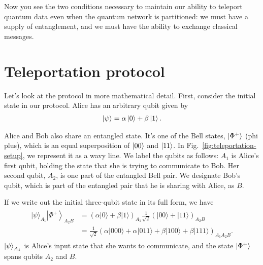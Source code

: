 Now you see the two conditions necessary to maintain our ability to teleport quantum data even when the quantum network is partitioned: we must have a supply of entanglement, and we must have the ability to exchange classical messages.

\section{Teleportation protocol}
\label{sec:8-2_teleportation_protocol}


Let's look at the protocol in more mathematical detail.  First, consider the initial state in our protocol. Alice has an arbitrary qubit given by
\begin{align}
    \left| \psi \right\rangle = \alpha\left| 0 \right\rangle + \beta\left| 1 \right\rangle.
\end{align}

Alice and Bob also share an entangled state. It's one of the Bell states, $\left| \Phi^+ \right\rangle$ (phi plus), which is an equal superposition of $\left| 00 \right\rangle$ and $\left| 11 \right\rangle$.  In Fig.~\ref{fig:teleportation-setup}, we represent it as a wavy line. We label the qubits as follows: $A_1$ is Alice's first qubit, holding the state that she is trying to communicate to Bob.  Her second qubit, $A_2$, is one part of the entangled Bell pair. We designate Bob's qubit, which is part of the entangled pair that he is sharing with Alice, as $B$.

If we write out the initial three-qubit state in its full form, we have
\begin{align}
    \begin{aligned}
|\psi\rangle_{A_{1}}\left|\Phi^{+}\right\rangle_{A_{2} B} &=(\alpha|0\rangle+\beta|1\rangle)_{A_{1}} \frac{1}{\sqrt{2}}(|00\rangle+|11\rangle)_{A_{2} B} \\
&=\frac{1}{\sqrt{2}}(\alpha|000\rangle+\alpha|011\rangle+\beta|100\rangle+\beta|111\rangle)_{A_{1} A_{2} B}.
\end{aligned}
\end{align}
$\left| \psi \right\rangle_{A_1}$ is Alice's input state that she wants to communicate, and the state $\left| \Phi^+ \right\rangle$ spans qubits $A_2$ and $B$.

